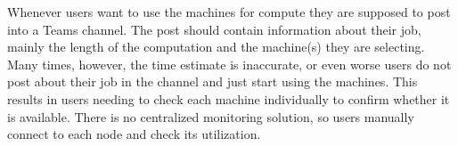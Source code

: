 Whenever users want to use the machines for compute they are supposed to post into a Teams channel. The post should contain information about their job, mainly the length of the computation and the machine(s) they are selecting. Many times, however, the time estimate is inaccurate, or even worse users do not post about their job in the channel and just start using the machines. This results in users needing to check each machine individually to confirm whether it is available. There is no centralized monitoring solution, so users manually connect to each node and check its utilization.

